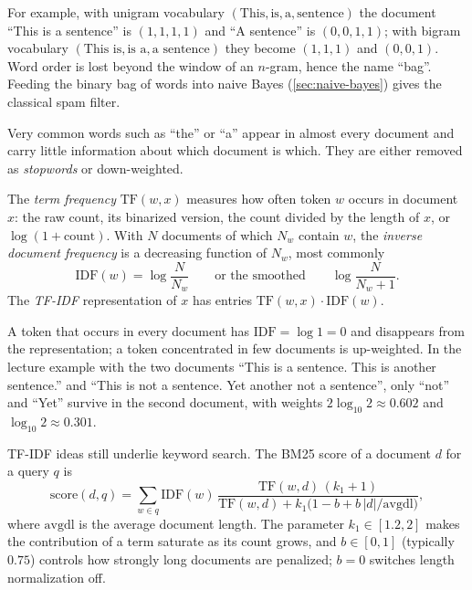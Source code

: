 For example, with unigram vocabulary $(\text{This},\text{is},\text{a},\text{sentence})$ the document ``This is a sentence'' is $(1,1,1,1)$ and ``A sentence'' is $(0,0,1,1)$; with bigram vocabulary $(\text{This is},\text{is a},\text{a sentence})$ they become $(1,1,1)$ and $(0,0,1)$. Word order is lost beyond the window of an $n$-gram, hence the name ``bag''. Feeding the binary bag of words into naive Bayes (\cref{sec:naive-bayes}) gives the classical spam filter.

Very common words such as ``the'' or ``a'' appear in almost every document and carry little information about which document is which. They are either removed as \emph{stopwords} or down-weighted.

\begin{definition}[TF-IDF]\label{def:tfidf}
The \emph{term frequency} $\mathrm{TF}(w,x)$ measures how often token $w$ occurs in document $x$: the raw count, its binarized version, the count divided by the length of $x$, or $\log(1+\text{count})$. With $N$ documents of which $N_w$ contain $w$, the \emph{inverse document frequency} is a decreasing function of $N_w$, most commonly
\[
\mathrm{IDF}(w)=\log\frac{N}{N_w}\qquad\text{or the smoothed}\qquad \log\frac{N}{N_w+1}.
\]
The \emph{TF-IDF} representation of $x$ has entries $\mathrm{TF}(w,x)\cdot\mathrm{IDF}(w)$.
\end{definition}

A token that occurs in every document has $\mathrm{IDF}=\log 1=0$ and disappears from the representation; a token concentrated in few documents is up-weighted. In the lecture example with the two documents ``This is a sentence. This is another sentence.'' and ``This is not a sentence. Yet another not a sentence'', only ``not'' and ``Yet'' survive in the second document, with weights $2\log_{10}2\approx0.602$ and $\log_{10}2\approx0.301$.

\begin{remark}[BM25]
TF-IDF ideas still underlie keyword search. The BM25 score of a document $d$ for a query $q$ is
\[
\mathrm{score}(d,q)=\sum_{w\in q}\mathrm{IDF}(w)\,\frac{\mathrm{TF}(w,d)\,(k_1+1)}{\mathrm{TF}(w,d)+k_1\big(1-b+b\,|d|/\mathrm{avgdl}\big)},
\]
where $\mathrm{avgdl}$ is the average document length. The parameter $k_1\in[1.2,2]$ makes the contribution of a term saturate as its count grows, and $b\in[0,1]$ (typically $0.75$) controls how strongly long documents are penalized; $b=0$ switches length normalization off.
\end{remark}

